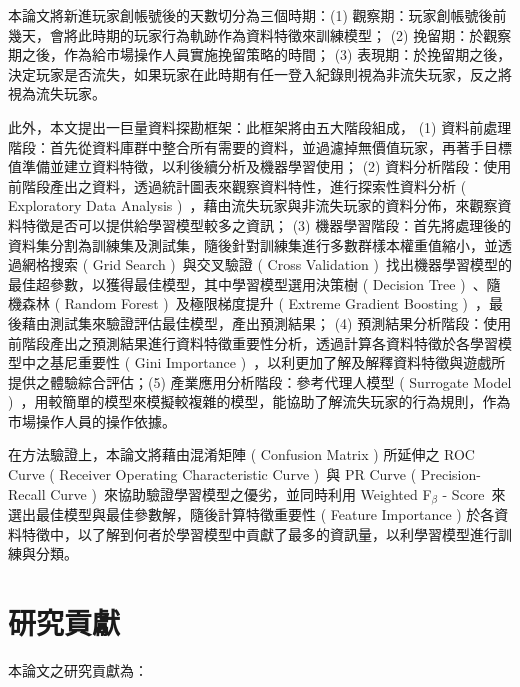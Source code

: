 本論文將新進玩家創帳號後的天數切分為三個時期：(1) 觀察期：玩家創帳號後前幾天，會將此時期的玩家行為軌跡作為資料特徵來訓練模型； (2) 挽留期：於觀察期之後，作為給市場操作人員實施挽留策略的時間； (3) 表現期：於挽留期之後，決定玩家是否流失，如果玩家在此時期有任一登入紀錄則視為非流失玩家，反之將視為流失玩家。

此外，本文提出一巨量資料探勘框架：此框架將由五大階段組成， (1) 資料前處理階段：首先從資料庫群中整合所有需要的資料，並過濾掉無價值玩家，再著手目標值準備並建立資料特徵，以利後續分析及機器學習使用； (2) 資料分析階段：使用前階段產出之資料，透過統計圖表來觀察資料特性，進行探索性資料分析 ( Exploratory Data Analysis )~\cite{tukey1977exploratory}，藉由流失玩家與非流失玩家的資料分佈，來觀察資料特徵是否可以提供給學習模型較多之資訊； (3) 機器學習階段：首先將處理後的資料集分割為訓練集及測試集，隨後針對訓練集進行多數群樣本權重值縮小，並透過網格搜索 ( Grid Search )~\cite{wiki:HyperparameterOptimization}與交叉驗證 ( Cross Validation )~\cite{wiki:CrossValidation}找出機器學習模型的最佳超參數，以獲得最佳模型，其中學習模型選用決策樹 ( Decision Tree )~\cite{breiman1984classification}、隨機森林 ( Random Forest )~\cite{breiman2001random}及極限梯度提升 ( Extreme Gradient Boosting )~\cite{chen2016xgboost}，最後藉由測試集來驗證評估最佳模型，產出預測結果； (4) 預測結果分析階段：使用前階段產出之預測結果進行資料特徵重要性分析，透過計算各資料特徵於各學習模型中之基尼重要性 ( Gini Importance )~\cite{GiniImportance}，以利更加了解及解釋資料特徵與遊戲所提供之體驗綜合評估；(5) 產業應用分析階段：參考代理人模型 ( Surrogate Model )~\cite{wiki:SurrogateModel}，用較簡單的模型來模擬較複雜的模型，能協助了解流失玩家的行為規則，作為市場操作人員的操作依據。

在方法驗證上，本論文將藉由混淆矩陣 ( Confusion Matrix ) 所延伸之 ROC Curve ( Receiver Operating Characteristic Curve )~\cite{fawcett2006introduction}與 PR Curve ( Precision-Recall Curve )~\cite{article}來協助驗證學習模型之優劣，並同時利用 Weighted F$_{\beta}$ - Score~\cite{Goutte2005API}來選出最佳模型與最佳參數解，隨後計算特徵重要性 ( Feature Importance ) 於各資料特徵中，以了解到何者於學習模型中貢獻了最多的資訊量，以利學習模型進行訓練與分類。

\section{研究貢獻}

本論文之研究貢獻為：

